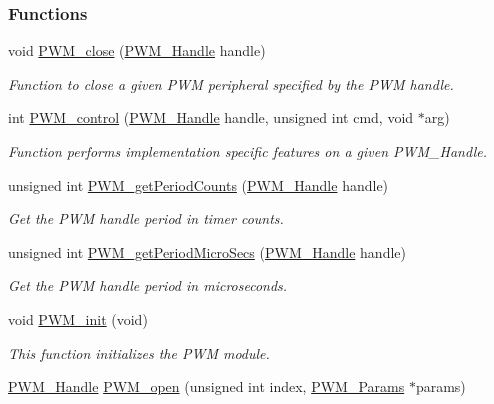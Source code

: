 \subsubsection*{Functions}
\begin{DoxyCompactItemize}
\item 
void \hyperlink{_p_w_m_8h_a0e0f5899b067d27653db566fb148db11}{P\-W\-M\-\_\-close} (\hyperlink{_p_w_m_8h_afdefc765f42bbad4dca246fda6e1354b}{P\-W\-M\-\_\-\-Handle} handle)
\begin{DoxyCompactList}\small\item\em Function to close a given P\-W\-M peripheral specified by the P\-W\-M handle. \end{DoxyCompactList}\item 
int \hyperlink{_p_w_m_8h_ade999f5b12997479efa1ac85aaf46ef5}{P\-W\-M\-\_\-control} (\hyperlink{_p_w_m_8h_afdefc765f42bbad4dca246fda6e1354b}{P\-W\-M\-\_\-\-Handle} handle, unsigned int cmd, void $\ast$arg)
\begin{DoxyCompactList}\small\item\em Function performs implementation specific features on a given P\-W\-M\-\_\-\-Handle. \end{DoxyCompactList}\item 
unsigned int \hyperlink{_p_w_m_8h_af7c6d8e045f6f5cc8b978d68bead5b41}{P\-W\-M\-\_\-get\-Period\-Counts} (\hyperlink{_p_w_m_8h_afdefc765f42bbad4dca246fda6e1354b}{P\-W\-M\-\_\-\-Handle} handle)
\begin{DoxyCompactList}\small\item\em Get the P\-W\-M handle period in timer counts. \end{DoxyCompactList}\item 
unsigned int \hyperlink{_p_w_m_8h_a150ccda2b9cb65f8c12d173bba10df53}{P\-W\-M\-\_\-get\-Period\-Micro\-Secs} (\hyperlink{_p_w_m_8h_afdefc765f42bbad4dca246fda6e1354b}{P\-W\-M\-\_\-\-Handle} handle)
\begin{DoxyCompactList}\small\item\em Get the P\-W\-M handle period in microseconds. \end{DoxyCompactList}\item 
void \hyperlink{_p_w_m_8h_aadae3fe77e36cbf9643a22eeb99fb01e}{P\-W\-M\-\_\-init} (void)
\begin{DoxyCompactList}\small\item\em This function initializes the P\-W\-M module. \end{DoxyCompactList}\item 
\hyperlink{_p_w_m_8h_afdefc765f42bbad4dca246fda6e1354b}{P\-W\-M\-\_\-\-Handle} \hyperlink{_p_w_m_8h_ac963beab0c5c6901bf852f175028aeaf}{P\-W\-M\-\_\-open} (unsigned int index, \hyperlink{struct_p_w_m___params}{P\-W\-M\-\_\-\-Params} $\ast$params)

\end{DoxyCompactItemize}
